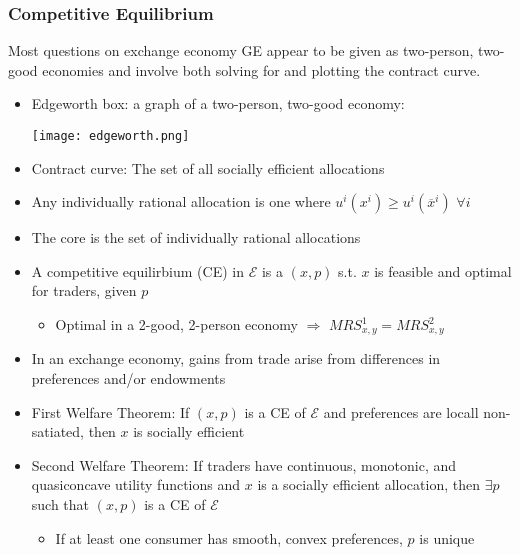 \documentclass{article}
\newcommand{\olx}{\overline{x}}
\newcommand{\Epsilon}{\mathcal{E}}
\newcommand{\red}[1]{{\color{red}#1}}
\newcommand{\blue}[1]{{\color{blue}#1}}
\begin{document}
\subsubsection{Competitive Equilibrium}
\red{Most questions on exchange economy GE appear to be given as two-person, two-good economies and involve both solving for and plotting the contract curve.}
\begin{itemize}
	\item \blue{Edgeworth box:} a graph of a two-person, two-good economy:
		\begin{center}
			\texttt{[image: edgeworth.png]}
		\end{center}
	\item \blue{Contract curve:} The set of all socially efficient allocations
	\item Any individually rational allocation is one where $u^i(x^i)\geq u^i(\olx^i)$ $\forall i$
	\item The \blue{core} is the set of individually rational allocations
	\item A competitive equilirbium (CE) in $\Epsilon$ is a $(x,p)$ s.t. $x$ is feasible and optimal for traders, given $p$
		\begin{itemize}
			\item Optimal in a 2-good, 2-person economy $\Rightarrow$ $MRS^1_{x,y}=MRS^2_{x,y}$
		\end{itemize}
	\item In an exchange economy, gains from trade arise from differences in preferences and/or endowments
	\item \blue{First Welfare Theorem:} If $(x,p)$ is a CE of $\Epsilon$ and preferences are locall non-satiated, then $x$ is socially efficient
	\item \blue{Second Welfare Theorem:} If traders have continuous, monotonic, and quasiconcave utility functions and $x$ is a socially efficient allocation, then ${\exists p}$ such that $(x,p)$ is a CE of $\Epsilon$ 
		\begin{itemize}
			\item If at least one consumer has smooth, convex preferences, $p$ is unique
		\end{itemize}
\end{itemize}
\end{document}
